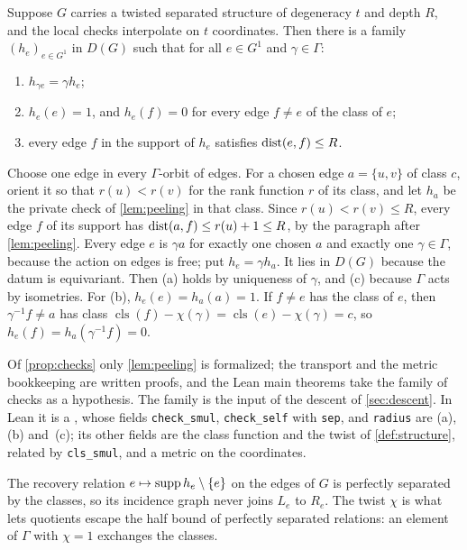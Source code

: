 \begin{proposition}\label{prop:checks}
\notformalized
Suppose $G$ carries a twisted separated structure of degeneracy $t$ and depth $R$, and the local checks interpolate on
$t$ coordinates. Then there is a family $(h_e)_{e\in G^1}$ in $D(G)$ such that for all $e\in G^1$ and $\gamma\in\Gamma$:
\begin{enumerate}[label=(\alph*)]
\item $h_{\gamma e}=\gamma h_e$;
\item $h_e(e)=1$, and $h_e(f)=0$ for every edge $f\ne e$ of the class of $e$;
\item every edge $f$ in the support of $h_e$ satisfies $\operatorname{dist}(e,f)\le R$.
\end{enumerate}
\end{proposition}
\begin{informalproof}
Choose one edge in every $\Gamma$-orbit of edges. For a chosen edge $a=\{u,v\}$ of class $c$, orient it so that
$r(u)<r(v)$ for the rank function $r$ of its class, and let $h_a$ be the private check of \cref{lem:peeling} in that
class. Since $r(u)<r(v)\le R$, every edge $f$ of its support has $\operatorname{dist}(a,f)\le r(u)+1\le R$, by the paragraph after
\cref{lem:peeling}. Every edge $e$ is
$\gamma a$ for exactly one chosen $a$ and exactly one $\gamma\in\Gamma$, because the action on edges is free; put
$h_e=\gamma h_a$. It lies in $D(G)$ because the datum is equivariant. Then (a) holds by uniqueness of $\gamma$, and
(c) because $\Gamma$ acts by isometries. For (b), $h_e(e)=h_a(a)=1$. If $f\ne e$ has the class of $e$, then
$\gamma^{-1}f\ne a$ has class $\operatorname{cls}(f)-\chi(\gamma)=\operatorname{cls}(e)-\chi(\gamma)=c$, so
$h_e(f)=h_a(\gamma^{-1}f)=0$.
\end{informalproof}

Of \cref{prop:checks} only \cref{lem:peeling} is formalized; the transport and the metric bookkeeping are written
proofs, and the Lean main theorems take the family of checks as a hypothesis. The family is the input of the descent of
\cref{sec:descent}. In Lean it is a , whose fields \texttt{check\_smul},
\texttt{check\_self} with \texttt{sep}, and \texttt{radius} are (a), (b) and~(c); its other fields are the class
function and the twist of \cref{def:structure}, related by \texttt{cls\_smul}, and a metric on the coordinates.

The recovery relation $e\mapsto\operatorname{supp} h_e\setminus\{e\}$ on the edges of $G$ is perfectly separated by the classes, so
its incidence graph never joins $L_e$ to $R_e$. The twist $\chi$ is what lets quotients escape the half bound of
perfectly separated relations: an element of $\Gamma$ with $\chi=1$ exchanges the classes.

